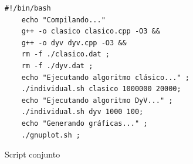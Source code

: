 \documentclass[12pt,spanish]{article}
\begin{document}
\begin{figure}[H]
\begin{verbatim}
#!/bin/bash
	echo "Compilando..."
	g++ -o clasico clasico.cpp -O3 &&
	g++ -o dyv dyv.cpp -O3 &&
	rm -f ./clasico.dat ;
	rm -f ./dyv.dat ;
	echo "Ejecutando algoritmo clásico..." ;
	./individual.sh clasico 1000000 20000;
	echo "Ejecutando algoritmo DyV..." ;
	./individual.sh dyv 1000 100;
	echo "Generando gráficas..." ;
	./gnuplot.sh ;
\end{verbatim}
\caption{Script conjunto}
\end{figure}


\end{document}
